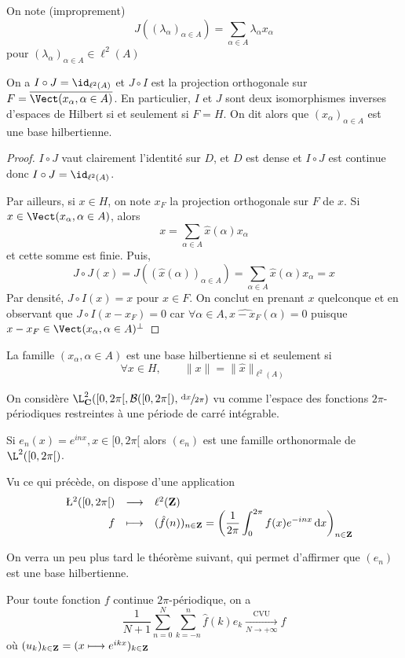 On note (improprement) \[
    J((\lambda_\alpha)_{\alpha \in A})=\sum_{\alpha \in A}\lambda_\alpha x_\alpha
\]
pour $(\lambda_\alpha)_{\alpha \in  A} \in  \ell^2(A)$

\begin{thm}
    On a $I\circ J=\id_{\ell^2(A)}$ et $J\circ I$ est la projection orthogonale sur  $F=\bar{\Vect(x_\alpha, \alpha \in  A)}$. En particulier, $I$ et  $J$ sont deux isomorphismes inverses d'espaces de Hilbert  si et seulement si $F=H$. On dit alors que $(x_\alpha)_{\alpha \in  A}$ est une base hilbertienne.
\end{thm}

\begin{proof}
    $I\circ J$ vaut clairement l'identité sur  $D$, et  $D$ est dense et  $I\circ J$ est continue donc  $I\circ J=\id_{\ell^2(A)}$. 

    Par ailleurs, si $x \in  H$, on note $x_F$ la projection orthogonale sur  $F$ de  $x$. Si $x \in  \Vect(x_\alpha, \alpha \in  A)$, alors \[
        x = \sum_{\alpha \in  A}\hat{x}(\alpha)x_\alpha
    \] 
    et cette somme est finie. Puis, \[
        J\circ J(x)=J((\hat{x} (\alpha))_{\alpha \in  A})=\sum_{\alpha \in  A}\hat{x} (\alpha)x_\alpha=x
    \] 
    Par densité, $J\circ I(x)=x$ pour  $x \in  F$. On conclut en prenant $x$ quelconque et en observant que  $J\circ I(x-x_F)=0$ car  $\forall  \alpha \in A, \hat{x-x_F}(\alpha)=0$ puisque $x-x_F \in  \Vect(x_\alpha, \alpha \in  A)^\bot$
\end{proof}

\begin{cor}
    La famille $(x_\alpha, \alpha \in A)$ est une base hilbertienne si et seulement si \[
        \forall  x \in  H, \qquad  \|x\|= \|\hat{x}\|_{\ell^2(A)}
    \]
\end{cor}

\begin{rem}[Conséquence]
    On considère $\L^2_\C([0, 2\pi[, \mathcal  B([0, 2\pi[), \sfrac{\diff x}{2\pi})$ vu comme l'espace des fonctions $2\pi$-périodiques restreintes à une période de carré intégrable.

    Si $e_n(x)=e^{inx}, x \in  [0, 2\pi[$ alors $(e_n)$ est une famille orthonormale de  $\L^2([0, 2\pi[)$.

    Vu ce qui précède, on dispose d'une application \[
    \begin{array}{rrcl}
        &  \L^2([0, 2\pi[)& \longrightarrow & \ell^2(\Z) \\
        & f & \longmapsto & \displaystyle (\hat{f}(n))_{n \in  \Z}= \left( \frac{1}{2\pi}\int_0^{2\pi} f(x)e^{-inx}\diff x \right)_{n \in  \Z}
    \end{array}
    \] 

    On verra un peu plus tard le théorème suivant, qui permet d'affirmer que $(e_n)$ est une base hilbertienne.
\end{rem}

\begin{thm}[Féjer]
Pour toute fonction $f$ continue  $2\pi$-périodique, on a \[
    \frac{1}{N+1} \sum_{n=0}^N\sum_{k=-n}^n \hat f(k)e_k \xrightarrow[N\to+\infty]{\text{CVU}} f
\] 
où $(u_k)_{k \in \mathbf Z}=(x \longmapsto e^{ikx})_{k \in  \mathbf Z}$
\end{thm}
